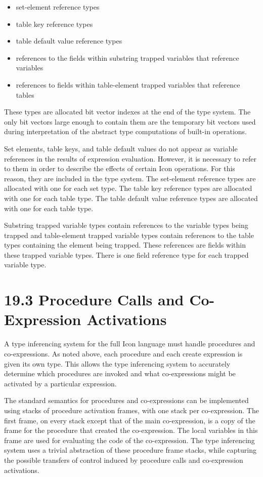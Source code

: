 \liststyleLxxxiii
\begin{itemize}
\item 
set-element reference types 
\item 
table key reference types 
\item 
table default value reference types 
\item 
references to the fields within substring trapped variables that reference variables 
\item 
references to fields within table-element trapped variables that reference tables 
\end{itemize}

These types are allocated bit vector indexes at the end of the type
system. The only bit vectors large enough to contain them are the
temporary bit vectors used during interpretation of the abstract type
computations of built-in operations.

Set elements, table keys, and table default values do not appear as
variable references in the results of expression evaluation. However,
it is necessary to refer to them in order to describe the effects of
certain Icon operations. For this reason, they are included in the
type system. The set-element reference types are allocated with one
for each set type. The table key reference types are allocated with
one for each table type. The table default value reference types are
allocated with one for each table type.

Substring trapped variable types contain references to the variable
types being trapped and table-element trapped variable types contain
references to the table types containing the element being
trapped. These references are fields within these trapped variable
types. There is one field reference type for each trapped variable
type.


\section[19.3 Procedure Calls and Co-Expression Activations]{19.3 Procedure Calls and Co-Expression Activations}

A type inferencing system for the full Icon language must handle
procedures and co-expressions. As noted above, each procedure and each
create expression is given its own type. This allows the type
inferencing system to accurately determine which procedures are
invoked and what co-expressions might be activated by a particular
expression.

The standard semantics for procedures and co-expressions can be
implemented using stacks of procedure activation frames, with one
stack per co-expression. The first frame, on every stack except that
of the main co-expression, is a copy of the frame for the procedure
that created the co-expression. The local variables in this frame are
used for evaluating the code of the co-expression. The type
inferencing system uses a trivial abstraction of these procedure frame
stacks, while capturing the possible transfers of control induced by
procedure calls and co-expression activations.

